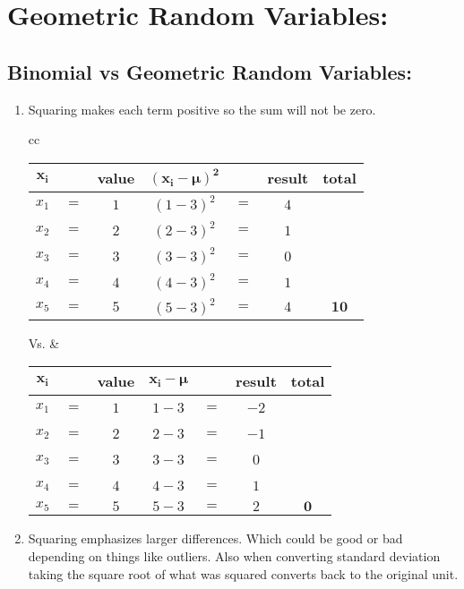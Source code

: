 \documentclass[12pt]{article}
\newcommand{\negBi}[3][2]{{(#2- #3)}^{#1}}
\newcommand{\negBiBold}[3][2]{\bm{{(#2- #3)}^{#1}} }
\begin{document}
\section*{Geometric Random Variables:}

  \subsection*{Binomial vs Geometric Random Variables:}
\begin{enumerate}
  \item Squaring makes each term positive so the sum will not be zero.
  \begin{table}[h!]
  \begin{center}
  \begin{tabular}{cc}
    \begin{tabular}{ccccccc}
      \toprule
      $\bm{x_{i}}$ & \ & \textbf{value} & $\negBiBold{x_{i}}{\mu}$ &
      \ & \textbf{result} & \textbf{total} \\
      \midrule
      $x_{1}$ & $=$ & $1$ & $\negBi{1}{3}$ & $=$ & $4$ & \ \\
      $x_{2}$ & $=$ & $2$ & $\negBi{2}{3}$ & $=$ & $1$ & \ \\
      $x_{3}$ & $=$ & $3$ & $\negBi{3}{3}$ & $=$ & $0$ & \ \\
      $x_{4}$ & $=$ & $4$ & $\negBi{4}{3}$ & $=$ & $1$ & \ \\
      $x_{5}$ & $=$ & $5$ & $\negBi{5}{3}$ & $=$ & $4$ & $\bm{10}$ \\
      \bottomrule
    \end{tabular} Vs. &
    \begin{tabular}{ccccccc}
      \toprule
      $\bm{x_{i}}$ & \ & \textbf{value} & $\bm{x_{i} - \mu}$ &
      \ & \textbf{result} & \textbf{total}\\
      \midrule
      $x_{1}$ & $=$ & $1$ & $1 - 3$ & $=$ & $-2$ & \ \\
      $x_{2}$ & $=$ & $2$ & $2 - 3$ & $=$ & $-1$ & \ \\
      $x_{3}$ & $=$ & $3$ & $3 - 3$ & $=$ & $0$ & \ \\
      $x_{4}$ & $=$ & $4$ & $4 - 3$ & $=$ & $1$ & \ \\
      $x_{5}$ & $=$ & $5$ & $5 - 3$ & $=$ & $2$ & $\bm{0}$ \\
      \bottomrule
    \end{tabular}
  \end{tabular}
  \label{ComparisonTable}
  \end{center}
  \end{table}
  \item Squaring emphasizes larger differences. Which could be good or bad depending on things like outliers. Also when converting standard deviation taking the square root of what was squared converts back to the original unit.

\end{enumerate}

\end{document}
